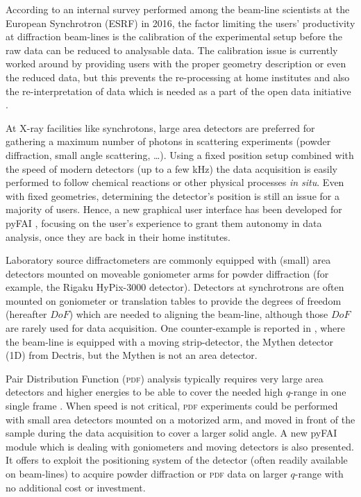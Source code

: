 \documentclass[preprint]{iucr}              %
\begin{document}
According to an internal survey performed among the beam-line scientists at
the European Synchrotron (ESRF) in 2016, the factor limiting the users'
productivity at diffraction beam-lines is the calibration of the experimental
setup before the raw data can be reduced to analysable data.
The calibration issue is currently worked around by providing users with the
proper geometry description or even the reduced data, but this prevents the
re-processing at home institutes and also the re-interpretation of data which
is needed as a part of the open data initiative \cite{Wilkinson2016}.

At X-ray facilities like synchrotons, large area detectors are 
preferred for gathering a maximum number of photons in
scattering experiments (powder diffraction, small angle
scattering, \ldots).
Using a fixed position setup combined with the speed of modern detectors (up
to a few kHz) the data acquisition is easily
performed to follow chemical reactions or other physical processes \textit{in situ}.
Even with fixed geometries, determining the detector's position is
still an issue for a majority of users. 
Hence, a new graphical user interface has been developed for pyFAI
\cite{pyFAI_0.18}, focusing on the user's experience to grant them autonomy in
data analysis, once they are back in their home institutes.

Laboratory source diffractometers
are commonly equipped with (small) area detectors mounted on moveable goniometer
arms for powder diffraction (for example, the Rigaku HyPix-3000 detector).
Detectors at synchrotrons are often mounted on goniometer or
translation tables to provide the degrees of freedom (hereafter $DoF$) which are 
needed to aligning the beam-line, although those $DoF$ are rarely used for data acquisition.
One counter-example is reported in \cite{Gao:kc5032}, where the beam-line
is equipped with a moving strip-detector, the Mythen detector (1D) from Dectris,
but the Mythen is not an area detector.




Pair Distribution Function (\textsc{pdf}) analysis typically requires very large area
detectors and higher energies to be able to cover the needed high $q$-range in
one single frame \cite{Chupas:wf5000}.
When speed is not critical, \textsc{pdf} experiments could be performed
with small area detectors mounted on a motorized arm, and moved in front of
the sample during the data acquisition to cover a larger solid angle. 
A new pyFAI module which is dealing with goniometers and moving detectors is also presented.
It offers to exploit the positioning system of the detector 
(often readily available on beam-lines) to acquire powder diffraction or \textsc{pdf} data 
on larger $q$-range with no additional cost or investment.
\end{document}
